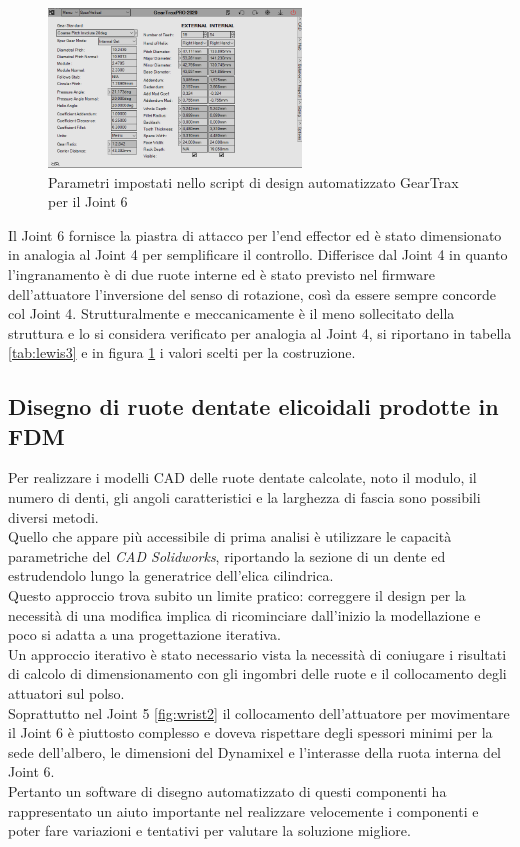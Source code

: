 \documentclass[%
corpo=11pt,
twoside,
 stile=classica,
oldstyle,
greek,%
]{toptesi}
\begin{document}
	\begin{figure} [H]
		\centering
		\includegraphics[width=0.6\textwidth]{Plots/POLSO3/gear_polso3.png}
		\caption{Parametri impostati nello script di design automatizzato GearTrax per il Joint 6}
		\label{fig:Gearpolso3}
	\end{figure} 
	Il Joint 6 fornisce la piastra di attacco per l'end effector ed è stato dimensionato in analogia al Joint 4 per semplificare il controllo. Differisce dal Joint 4 in quanto l'ingranamento è di due ruote interne ed è stato previsto nel firmware dell'attuatore l'inversione del senso di rotazione, così da essere sempre concorde col Joint 4. Strutturalmente e meccanicamente è il meno sollecitato della struttura e lo si considera verificato per analogia al Joint 4, si riportano in tabella \ref{tab:lewis3} e in figura \ref{fig:Gearpolso3} i valori scelti per la costruzione. 
	
		\subsection{Disegno di ruote dentate elicoidali prodotte in FDM}
		Per realizzare i modelli CAD delle ruote dentate calcolate, noto il modulo, il numero di denti, gli angoli caratteristici e la larghezza di fascia sono possibili diversi metodi.\\ 
		Quello che appare più accessibile di prima analisi è utilizzare le capacità parametriche del \textit{ CAD Solidworks}, riportando la sezione di un dente ed estrudendolo lungo la generatrice dell'elica cilindrica. \\
		Questo approccio trova subito un limite pratico: correggere il design per la necessità di una modifica implica di ricominciare dall'inizio la modellazione e poco si adatta a una progettazione iterativa. \\
		Un approccio iterativo è stato necessario vista la necessità di coniugare i risultati di calcolo di dimensionamento con gli ingombri delle ruote e il collocamento degli attuatori sul polso.\\
		 Soprattutto nel Joint 5 \ref{fig:wrist2} il collocamento dell'attuatore per movimentare il Joint 6 è piuttosto complesso e doveva rispettare degli spessori minimi per la sede dell'albero, le dimensioni del Dynamixel e l'interasse della ruota interna del Joint 6. \\
		Pertanto un software di disegno automatizzato di questi componenti ha rappresentato un aiuto importante nel realizzare velocemente i componenti e poter fare variazioni e tentativi per valutare la soluzione migliore. \\
		
\end{document}
